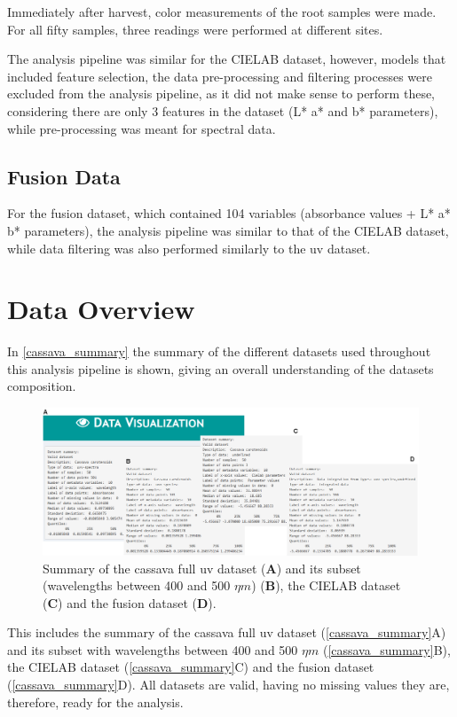 Immediately after harvest, color measurements of the root samples were made. For all fifty samples, three readings were performed at different sites.

The analysis pipeline was similar for the CIELAB dataset, however, models that included feature selection, the data pre-processing and filtering processes were excluded from the analysis pipeline, as it did not make sense to perform these, considering there are only 3 features in the dataset (L* a* and b* parameters), while pre-processing was meant for spectral data.

\subsection{Fusion Data}

For the fusion dataset, which contained 104 variables (absorbance values + L* a* b* parameters), the analysis pipeline was similar to that of the CIELAB dataset, while data filtering was also performed similarly to the \gls{uv} dataset.

\section{Data Overview}

In \autoref{cassava_summary} the summary of the different datasets used throughout this analysis pipeline is shown, giving an overall understanding of the datasets composition. 

\begin{figure}[H]
	\centering
	\includegraphics[width=1\linewidth]{Imagens/Case_study/summary_subset_full}
	\caption{Summary of the cassava full \gls{uv} dataset (\textbf{A}) and its subset (wavelengths between 400 and 500 $\eta m$) (\textbf{B}), the CIELAB dataset (\textbf{C}) and the fusion dataset (\textbf{D}).}
	\label{cassava_summary}
\end{figure}

This includes the summary of the cassava full \gls{uv} dataset (\autoref{cassava_summary}A) and its subset with wavelengths between 400 and 500 $\eta m$ (\autoref{cassava_summary}B), the CIELAB dataset (\autoref{cassava_summary}C) and the fusion dataset (\autoref{cassava_summary}D). All datasets are valid, having no missing values they are, therefore, ready for the analysis.

